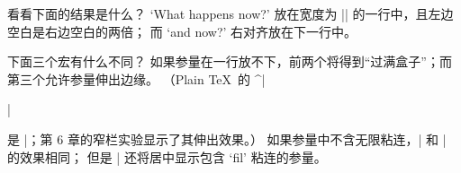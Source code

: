 \dangerexercise 看看下面的结果是什么？\xdef\linexno{\the\exno}%
\begintt
{}
\endtt
\answer `What happens now?' 放在宽度为 |\hsize| 的一行中，且左边空白是右边空白的两倍；
而 `and now?' 右对齐放在下一行中。

\ddangerexercise 下面三个宏有什么不同？
\begintt
\def\centerlinea#1{\line{\hfil#1\hfil}}
\def\centerlineb#1{\line{\hfill#1\hfill}}
\def\centerlinec#1{\line{\hss#1\hss}}
\endtt
\answer 如果参量在一行放不下，前两个将得到``过满盒子''；而第三个允许参量伸出边缘。%
（Plain \TeX\ 的 ^|\centerline| 是 |\centerlinec|；第 6 章的窄栏实验显示了其伸出效果。）
如果参量中不含无限粘连，|\centerlinea| 和 |\centerlineb| 的效果相同；
但是 |\centerlineb| 还将居中显示包含 `fil' 粘连的参量。

